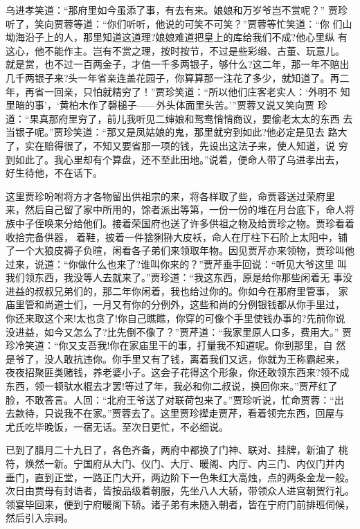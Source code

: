 乌进孝笑道：“那府里如今虽添了事，有去有来。娘娘和万岁爷岂不赏呢？”
贾珍听了，笑向贾蓉等道：“你们听听，他说的可笑不可笑？”贾蓉等忙笑道：“你
们山坳海沿子上的人，那里知道这道理?娘娘难道把皇上的库给我们不成?他心里纵
有这心，他不能作主。岂有不赏之理，按时按节，不过是些彩缎、古董、玩意儿。
就是赏，也不过一百两金子，才值一千多两银子，够什么?这二年，那一年不赔出
几千两银子来?头一年省亲连盖花园子，你算算那一注花了多少，就知道了。再二
年，再省一回亲，只怕就精穷了！”贾珍笑道：“所以他们庄客老实人：‘外明不
知里暗的事’，‘黄柏木作了磬槌子——外头体面里头苦。’”贾蓉又说又笑向贾
珍道：“果真那府里穷了，前儿我听见二婶娘和鸳鸯悄悄商议，要偷老太太的东西
去当银子呢。”贾珍笑道：“那又是凤姑娘的鬼，那里就穷到如此?他必定是见去
路大了，实在赔得很了，不知又要省那一项的钱，先设出这法子来，使人知道，说
穷到如此了。我心里却有个算盘，还不至此田地。”说着，便命人带了乌进孝出去，
好生待他，不在话下。

这里贾珍吩咐将方才各物留出供祖宗的来，将各样取了些，命贾蓉送过荣府里
来，然后自己留了家中所用的，馀者派出等第，一份一份的堆在月台底下，命人将
族中子侄唤来分给他们。接着荣国府也送了许多供祖之物及给贾珍之物。贾珍看着
收拾完备供器，着鞋，披着一件猞猁狲大皮袄，命人在厅柱下石阶上太阳中，铺
了一个大狼皮褥子负暄，闲看各子弟们来领取年物。因见贾芹亦来领物，贾珍叫他
过来，说道：“你做什么也来了?谁叫你来的？”贾芹垂手回说：“听见大爷这里
叫我们领东西，我没等人去就来了。”贾珍道：“我这东西，原是给你那些闲着无
事没进益的叔叔兄弟们的，那二年你闲着，我也给过你的。你如今在那府里管事，
家庙里管和尚道士们，一月又有你的分例外，这些和尚的分例银钱都从你手里过，
你还来取这个来!太也贪了!你自己瞧瞧，你穿的可像个手里使钱办事的?先前你说
没进益，如今又怎么了?比先倒不像了？”贾芹道：“我家里原人口多，费用大。”
贾珍冷笑道：“你又支吾我!你在家庙里干的事，打量我不知道呢。你到那里，自
然是爷了，没人敢抗违你。你手里又有了钱，离着我们又远，你就为王称霸起来，
夜夜招聚匪类赌钱，养老婆小子。这会子花得这个形象，你还敢领东西来?领不成
东西，领一顿驮水棍去才罢!等过了年，我必和你二叔说，换回你来。”贾芹红了
脸，不敢答言。人回：“北府王爷送了对联荷包来了。”贾珍听说，忙命贾蓉：“出
去款待，只说我不在家。”贾蓉去了。这里贾珍撵走贾芹，看着领完东西，回屋与
尤氏吃毕晚饭，一宿无话。至次日更忙，不必细说。

已到了腊月二十九日了，各色齐备，两府中都换了门神、联对、挂牌，新油了
桃符，焕然一新。宁国府从大门、仪门、大厅、暖阁、内厅、内三门、内仪门并内
垂门，直到正堂，一路正门大开，两边阶下一色朱红大高烛，点的两条金龙一般。
次日由贾母有封诰者，皆按品级着朝服，先坐八人大轿，带领众人进宫朝贺行礼。
领宴毕回来，便到宁府暖阁下轿。诸子弟有未随入朝者，皆在宁府门前排班伺候，
然后引入宗祠。

